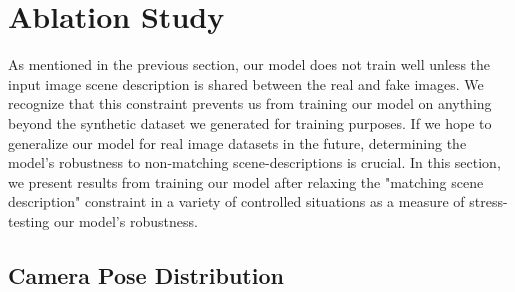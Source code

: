 \section{Ablation Study}

As mentioned in the previous section, our model does not train well unless the input image
scene description is shared between the real and fake images. We recognize that this
constraint prevents us from training our model on anything beyond the synthetic dataset we
generated for training purposes. If we hope to generalize our model for real image datasets
in the future, determining the model's robustness to non-matching scene-descriptions is
crucial. In this section, we present results from training our model after relaxing the
"matching scene description" constraint in a variety of controlled situations as a measure
of stress-testing our model's robustness.

\subsection{Camera Pose Distribution}

